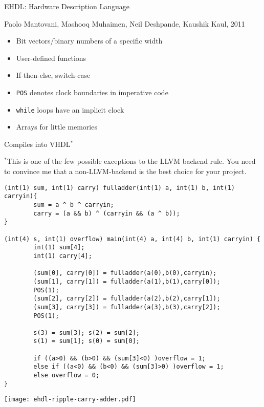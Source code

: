 \documentclass{plt}
\begin{document}
\begin{frame}{EHDL: Hardware Description Language}

{\small  
Paolo Mantovani,
Mashooq Muhaimen,
Neil Deshpande,
Kaushik Kaul,
2011
}

\begin{itemize}
\item Bit vectors/binary numbers of a specific width
\item User-defined functions
\item If-then-else, switch-case
\item \texttt{POS} denotes clock boundaries in imperative code
\item \texttt{while} loops have an implicit clock
\item Arrays for little memories
\end{itemize}

Compiles into VHDL$^*$

$^*$This is one of the few possible exceptions to the LLVM backend
rule.  You need to convince me that a non-LLVM-backend is the best
choice for your project.

\end{frame}

\begin{frame}[fragile]
\fontsize{7pt}{7pt}\selectfont
\begin{verbatim}
(int(1) sum, int(1) carry) fulladder(int(1) a, int(1) b, int(1) carryin){        
        sum = a ^ b ^ carryin;
        carry = (a && b) ^ (carryin && (a ^ b));       
}

(int(4) s, int(1) overflow) main(int(4) a, int(4) b, int(1) carryin) {         
        int(1) sum[4];
        int(1) carry[4];

        (sum[0], carry[0]) = fulladder(a(0),b(0),carryin);
        (sum[1], carry[1]) = fulladder(a(1),b(1),carry[0]);
        POS(1);
        (sum[2], carry[2]) = fulladder(a(2),b(2),carry[1]);
        (sum[3], carry[3]) = fulladder(a(3),b(3),carry[2]);
        POS(1);

        s(3) = sum[3]; s(2) = sum[2];
        s(1) = sum[1]; s(0) = sum[0];

        if ((a>0) && (b>0) && (sum[3]<0) )overflow = 1;
        else if ((a<0) && (b<0) && (sum[3]>0) )overflow = 1;
        else overflow = 0;
}
\end{verbatim}

\centerline{\texttt{[image: ehdl-ripple-carry-adder.pdf]}}
\end{frame}
\end{document}
